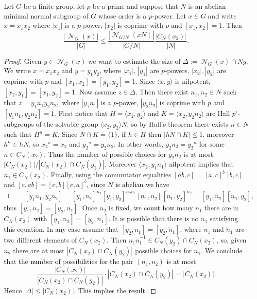\documentclass[10pt,a4paper]{amsart}
\DeclareMathOperator{\nil}{\mathcal N}
\begin{document}
\begin{lemma}\label{nilabcf}
	Let $G$ be a finite group, let $p$ be a prime and suppose that $N$ is an abelian minimal normal subgroup of $G$ whose order is a $p$-power. Let $x\in G$ and write
	$x=x_1x_2$ where $|x_1|$ is a $p$-power, $|x_2|$ is coprime with $p$ and $[x_1,x_2]=1.$
	Then
	$$\frac{|\nil_G(x)|}{|G|}\leq \frac{|\nil_{G/N}(xN)|}{|G/N|}\frac {|C_N(x_2)|}{|N|}.$$
\end{lemma}

\begin{proof}
   Given $y\in \nil_G(x)$ we want to estimate the size of $\Delta:=\nil_G(x)\cap Ny.$ We write $x=x_1x_2$ and $y=y_1y_2$, where $|x_1|$, $|y_1|$ are $p$-powers, $|x_2|, |y_2|$ are coprime with $p$ and $[x_1,x_2]=[y_1,y_2]=1.$ Since $\langle x,y
	\rangle$ is nilpotent, $[x_2,y_1]=[x_1,y_2]=1.$  Now assume $z\in \Delta.$ Then there exist $n_1, n_2\in N$ such that $z=y_1n_1y_2n_2,$ where $|y_1n_1|$ is a $p$-power, $|y_2n_2|$ is coprime with $p$ and $[y_1n_1,y_2n_2]=1.$
	First notice that $H = \langle x_2,y_2 \rangle$ and $K = \langle x_2, y_2n_2\rangle$ are Hall $p'$-subgroups of the solvable group $\langle x_2,y_2 \rangle N$, so by Hall's theorem there exists $n \in N$ such that $H^n = K$. Since $N \cap K = \{1\}$, if $h \in H$ then $|hN \cap K| \leq 1$, moreover $h^n \in hN$, so ${x_2}^n = x_2$ and ${y_2}^n = y_2n_2$. In other words, $y_2n_2 = {y_2}^{n}$ for some
	$n\in C_N(x_2).$ Thus the number of possible choices for
	$y_2n_2$ is at most $|C_N(x_2)|/|C_N(x_2)\cap C_N(y_2)|.$ Moreover
	$\langle x_2, y_1n_1\rangle$ nilpotent implies that $n_1\in C_N(x_2).$ Finally, using the commutator equalities $[ab,c]=[a,c]^b [b,c]$ and $[c,ab]=[c,b][c,a]^b$, since $N$ is abelian we have 
    \begin{align*}
        1 & = [y_1n_1,y_2n_2] = [y_1,n_2]^{n_1} [y_1,y_2]^{n_2n_1} [n_1,n_2] [n_1,y_2]^{n_2} = [y_1,n_2][n_1,y_2],
    \end{align*}
    thus $[y_1,n_2]=[y_2,n_1].$ Once $n_2$ is fixed, we count how many $n_1$ there are in $C_N(x_2)$ with $[y_1,n_2]=[y_2,n_1].$ It is possible that there is no $n_1$ satisfying this equation. In any case assume that 
	$[y_2,n_1]=[y_2,\tilde n_1]$, where $n_1$ and $\tilde n_1$ are two different elements of $C_N(x_2).$ Then $n_1\tilde n_1^{-1}\in C_N(y_2)\cap C_N(x_2)$, so, given $n_2$ there are at most $|C_N(x_2)\cap C_N(y_2)|$ possible choices for $n_1$. We conclude
	that the number of possibilities for the pair $(n_1,n_2)$
	is at most
	$$\frac{|C_N(x_2)|}{|C_N(x_2)\cap C_N(y_2)|}\cdot |C_N(x_2)\cap C_N(y_2)|=|C_N(x_2)|.
	$$
	Hence $|\Delta|\leq |C_N(x_2)|$. This implies the result.
\end{proof}
\end{document}
